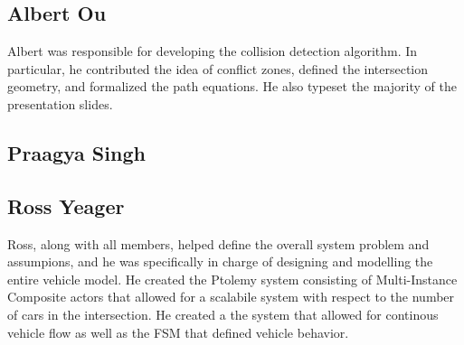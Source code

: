 \subsection{Albert Ou}

Albert was responsible for developing the collision detection algorithm.
In particular, he contributed the idea of conflict zones, defined the
intersection geometry, and formalized the path equations.
He also typeset the majority of the presentation slides.

\subsection{Praagya Singh}

\subsection{Ross Yeager}
Ross, along with all members, helped define the overall system problem and assumpions, and he was specifically in charge of designing and modelling the entire vehicle model.  
He created the Ptolemy system consisting of Multi-Instance Composite actors that allowed for a scalabile system with respect to the number of cars in the intersection.  
He created a the system that allowed for continous vehicle flow as well as the FSM that defined vehicle behavior.

